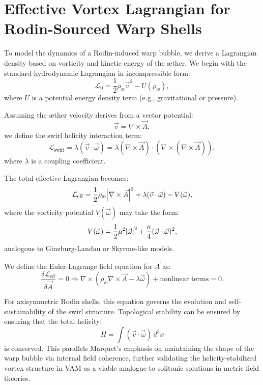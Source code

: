 \documentclass[12pt]{article}
\begin{document}
\section{Effective Vortex Lagrangian for Rodin-Sourced Warp Shells}
To model the dynamics of a Rodin-induced warp bubble, we derive a Lagrangian density based on vorticity and kinetic energy of the æther. We begin with the standard hydrodynamic Lagrangian in incompressible form:
\begin{equation}
    \mathcal{L}_0 = \frac{1}{2} \rho_\text{\ae} \vec{v}^2 - U(\rho_\text{\ae}),
\end{equation}
where \( U \) is a potential energy density term (e.g., gravitational or pressure).

Assuming the æther velocity derives from a vector potential:
\begin{equation}
    \vec{v} = \nabla \times \vec{A},
\end{equation}
we define the swirl helicity interaction term:
\begin{equation}
    \mathcal{L}_{\text{swirl}} = \lambda (\vec{v} \cdot \vec{\omega}) = \lambda (\nabla \times \vec{A}) \cdot (\nabla \times (\nabla \times \vec{A})),
\end{equation}
where \( \lambda \) is a coupling coefficient.

The total effective Lagrangian becomes:
\begin{equation}
    \mathcal{L}_{\text{eff}} = \frac{1}{2} \rho_\text{\ae} \abs{\nabla \times \vec{A}}^2 + \lambda (\vec{v} \cdot \vec{\omega}) - V(\vec{\omega}),
\end{equation}
where the vorticity potential \( V(\vec{\omega}) \) may take the form:
\begin{equation}
    V(\vec{\omega}) = \frac{1}{2} \mu^2 \abs{\vec{\omega}}^2 + \frac{\kappa}{4} (\vec{\omega} \cdot \vec{\omega})^2,
\end{equation}
analogous to Ginzburg-Landau or Skyrme-like models.

We define the Euler-Lagrange field equation for \( \vec{A} \) as:
\begin{equation}
    \frac{\delta \mathcal{L}_{\text{eff}}}{\delta \vec{A}} = 0 \Rightarrow \nabla \times \left( \rho_\text{\ae} \nabla \times \vec{A} - \lambda \vec{\omega} \right) + \text{nonlinear terms} = 0.
\end{equation}

For axisymmetric Rodin shells, this equation governs the evolution and self-sustainability of the swirl structure. Topological stability can be ensured by ensuring that the total helicity:
\begin{equation}
    H = \int (\vec{v} \cdot \vec{\omega}) \, d^3x
\end{equation}
is conserved.
This parallels Marquet's emphasis on maintaining the shape of the warp bubble via internal field coherence, further validating the helicity-stabilized vortex structure in VAM as a viable analogue to solitonic solutions in metric field theories.
\end{document}
